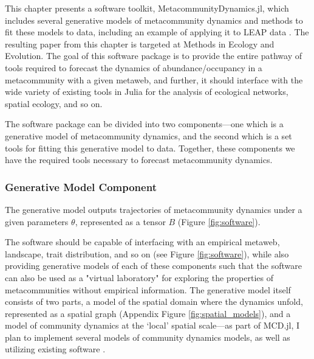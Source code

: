 \documentclass[]{article}
\begin{document}
This chapter presents a software toolkit, MetacommunityDynamics.jl, which includes several generative models of metacommunity dynamics and methods to fit these models to data, including an example of applying it to LEAP data \cite{Bell2019}. The resulting paper from this chapter is targeted at Methods in Ecology and Evolution.
The goal of this software package is to provide the entire pathway of tools required to forecast the dynamics of abundance/occupancy in a metacommunity with a given metaweb, and further, it should interface with the wide variety of existing tools in Julia for the analysis of ecological networks, spatial ecology, and so on. 

The software package can be divided into two components---one which is a generative model of metacommunity dynamics, and the second which is a set tools for fitting this generative model to data. Together,  these components we have the required tools necessary to  forecast metacommunity dynamics.

\subsubsection{Generative Model Component}

The generative model outputs trajectories of metacommunity dynamics under a given parameters $\theta$, represented as a tensor $B$ (Figure \ref{fig:software}).

The software should be capable of interfacing with an empirical metaweb, landscape, trait distribution, and so on (see Figure \ref{fig:software}), while also providing generative models of each of these components such that the software can also be used as a "virtual laboratory" for exploring the properties of metacommunities without empirical information. The generative model itself consists of two parts, a model of the 
spatial domain where the dynamics unfold, represented as a spatial graph (Appendix Figure \ref{fig:spatial_models}), and a model of community dynamics at the `local' spatial scale---as part of MCD.jl, I plan to implement several models of community dynamics \cite{thompson_process-based_2020, elkof_bayesian_2013} models, as well as utilizing existing software \cite{delmas_simulations_2017}.
\end{document}
